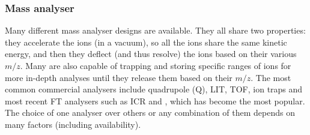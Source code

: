 \subsubsection{Mass analyser}

Many different mass analyser designs are available. They all share two properties:
they accelerate the ions (in a vacuum), so all the ions share the same kinetic
energy, and then they deflect (and thus resolve) the ions based on
their various $m/z$. Many are also
capable of trapping and storing specific ranges of ions for more in-depth analyses until
they release them based on their $m/z$.
The most common commercial analysers include quadrupole (Q), \acrfull{LIT},
\acrfull{TOF}, ion traps and most recent \gls{FT} analysers such as \acrfull{ICR}
and \orbi, which has become the most popular.
The choice of one analyser over others or any combination of them
depends on many factors (including availability).~\mybr\

